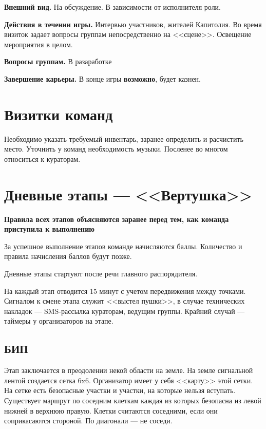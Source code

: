 \documentclass[a4paper, 14pt]{extarticle}
\theoremstyle{definition}
\begin{document}
\par \textbf{Внешний вид.} На обсуждение. В зависимости от исполнителя роли.

\par \textbf{Действия в течении игры.} Интервью участников, жителей Капитолия. Во время визиток задает вопросы группам непосредственно на <<сцене>>. Освещение мероприятия в целом.

\par \textbf{Вопросы группам.} В разаработке

\par \textbf{Завершение карьеры.} В конце игры \textbf{возможно}, будет казнен.



\section{Визитки команд}
\par Необходимо указать требуемый инвентарь, заранее определить и расчистить место. Уточнить у команд необходимость музыки. Посленее во многом относиться к кураторам.




\section{Дневные этапы --- <<Вертушка>>}

\par \textbf{Правила всех этапов объясняются заранее перед тем, как команда приступила к выполнению}
\par За успешное выполнение этапов команде начисляются баллы. Количество и правила начисления баллов будут позже.
\par Дневные этапы стартуют после речи главного распорядителя.
\par На каждый этап отводится 15 минут с учетом передвижения между точками. Сигналом к смене этапа служит <<выстел пушки>>, в случае технических накладок --- SMS-рассылка кураторам, ведущим группы. Крайний случай --- таймеры у организаторов на этапе.

\subsection{БИП}

\par Этап заключается в преодолении некой области на земле. На земле сигнальной лентой создается сетка 6x6. Организатор имеет у себя <<карту>> этой сетки. На сетке есть безопасные участки и участки, на которые нельзя вступать. Существует маршрут по соседним клеткам каждая из которых безопасна из левой нижней в верхнюю правую. Клетки считаются соседними, если они соприкасаются стороной. По диагонали --- не соседи.
\end{document}

